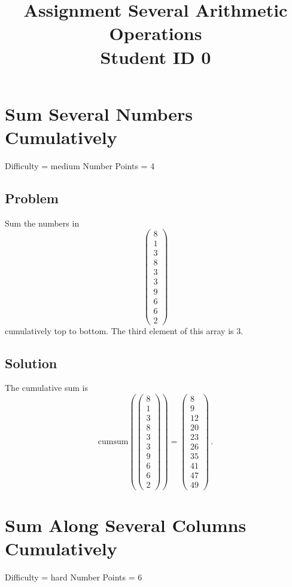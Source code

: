 \documentclass{article}
\title{Assignment Several Arithmetic Operations \\ Student ID 0}
\begin{document}
\maketitle

\section{Sum Several Numbers Cumulatively}
Difficulty = medium
Number Points = 4
\subsection{Problem}
Sum the numbers in $$\begin{pmatrix}
8\\1\\3\\8\\3\\3\\9\\6\\6\\2\end{pmatrix}
$$ cumulatively top to bottom. The third element of this array is $3$.
\subsection{Solution}
The cumulative sum is $$\text{cumsum}(\begin{pmatrix}
8\\1\\3\\8\\3\\3\\9\\6\\6\\2\end{pmatrix}
) = \begin{pmatrix}
8\\9\\12\\20\\23\\26\\35\\41\\47\\49\end{pmatrix}
\,.$$
\section{Sum Along Several Columns Cumulatively}
Difficulty = hard
Number Points = 6
\end{document}
